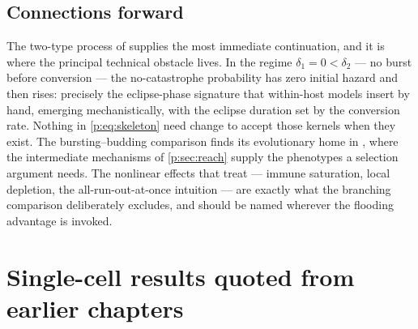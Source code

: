 \subsection{Connections forward}

The two-type process of \ChTwoType{} supplies the most immediate
continuation, and it is where the principal technical obstacle lives. In the
regime $\delta_1=0<\delta_2$ --- no burst before conversion --- the
no-catastrophe probability has zero initial hazard and then rises: precisely
the eclipse-phase signature that within-host models insert by hand, emerging
mechanistically, with the eclipse duration set by the conversion rate.
Nothing in \cref{p:eq:skeleton} need change to accept those kernels when
they exist. The bursting--budding comparison finds its evolutionary home in
\ChPath{}, where the intermediate mechanisms of \cref{p:sec:reach} supply
the phenotypes a selection argument needs. The nonlinear effects that
 treat --- immune saturation,
local depletion, the all-run-out-at-once intuition --- are exactly what the
branching comparison deliberately excludes, and should be named wherever the
flooding advantage is invoked.

\FloatBarrier

\begingroup
\omitfromtoc
\renewcommand{\theHsection}{\thechapter.appendix.\Alph{section}}
\renewcommand{\theHsubsection}{\theHsection.\arabic{subsection}}
\renewcommand{\thesection}{\thechapter.\Alph{section}}
\setcounter{section}{0}

\section{Single-cell results quoted from earlier chapters}
\label{p:app:quoted}

